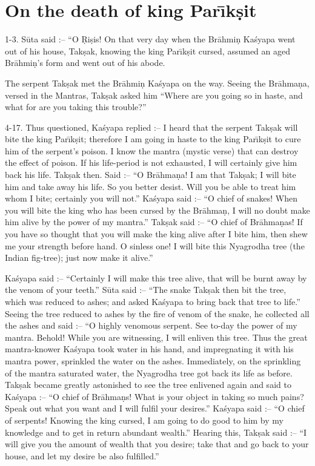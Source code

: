 \chapter{On the death of king Par\={\i}k\d{s}it}

1-3. S\=uta said :-- ``O \d{R}i\d{s}is! On that very day when the Br\=ahmi\d{n} Ka\'syapa went out of his house, Tak\d{s}ak, knowing the king Par\={\i}k\d{s}it cursed, assumed an aged Br\=ahmi\d{n}'s form and went out of his abode.

The serpent Tak\d{s}ak met the Br\=ahmi\d{n} Ka\'syapa on the way. Seeing the Br\=ahma\d{n}a, versed in the Mantras, Tak\d{s}ak asked him ``Where are you going so in haste, and what for are you taking this trouble?''

4-17. Thus questioned, Ka\'syapa replied :-- I heard that the serpent Tak\d{s}ak will bite the king Par\={\i}k\d{s}it; therefore I am going in haste to the king Par\={\i}k\d{s}it to cure him of the serpent's poison. I know the mantra (mystic verse) that can destroy the effect of poison. If his life-period is not exhausted, I will certainly give him back his life. Tak\d{s}ak then. Said :-- ``O Br\=ahma\d{n}a! I am that Tak\d{s}ak; I will bite him and take away his life. So you better desist. Will you be able to treat him whom I bite; certainly you will not.'' Ka\'syapa said :-- ``O chief of snakes! When you will bite the king who has been cursed by the Br\=ahma\d{n}, I will no doubt make him alive by the power of my mantra.'' Tak\d{s}ak said :-- ``O chief of Br\=ahma\d{n}as! If you have so thought that you will make the king alive after I bite him, then shew me your strength before hand. O sinless one! I will bite this Nyagrodha tree (the Indian fig-tree); just now make it alive.''

Ka\'syapa said :-- ``Certainly I will make this tree alive, that will be burnt away by the venom of your teeth.'' S\=uta said :-- ``The snake Tak\d{s}ak then bit the tree, which was reduced to ashes; and asked Ka\'syapa to bring back that tree to life.'' Seeing the tree reduced to ashes by the fire of venom of the snake, he collected all the ashes and said :-- ``O highly venomous serpent. See to-day the power of my mantra. Behold! While you are witnessing, I will enliven this tree. Thus the great mantra-knower Ka\'syapa took water in his hand, and impregnating it with his mantra power, sprinkled the water on the ashes. Immediately, on the sprinkling of the mantra saturated water, the Nyagrodha tree got back its life as before. Tak\d{s}ak became greatly astonished to see the tree enlivened again and said to Ka\'syapa :-- ``O chief of Br\=ahma\d{n}s! What is your object in taking so much pains? Speak out what you want and I will fulfil your desires.'' Ka\'syapa said :-- ``O chief of serpents! Knowing the king cursed, I am going to do good to him by my knowledge and to get in return abundant wealth.'' Hearing this, Tak\d{s}ak said :-- ``I will give you the amount of wealth that you desire; take that and go back to your house, and let my desire be also fulfilled.''

